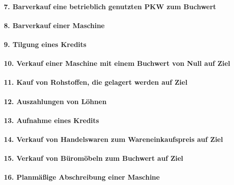 \documentclass[paper=a4, fontsize=11pt]{scrartcl}
\numberwithin{equation}{section}
\numberwithin{figure}{section}
\numberwithin{table}{section}
\begin{document}
\paragraph{7. Barverkauf eine betrieblich genutzten PKW zum Buchwert}

\paragraph{8. Barverkauf einer Maschine}

\paragraph{9. Tilgung eines Kredits}

\paragraph{10. Verkauf einer Maschine mit einem Buchwert von Null auf Ziel}

\paragraph{11. Kauf von Rohstoffen, die gelagert werden auf Ziel}

\paragraph{12. Auszahlungen von Löhnen}

\paragraph{13. Aufnahme eines Kredits}

\paragraph{14. Verkauf von Handelswaren zum Wareneinkaufspreis auf Ziel}

\paragraph{15. Verkauf von Büromöbeln zum Buchwert auf Ziel}

\paragraph{16. Planmäßige Abschreibung einer Maschine}



\end{document}
